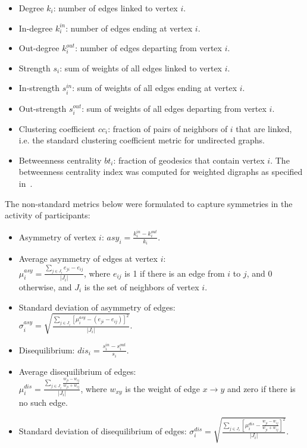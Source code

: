 \documentclass[%
aip,
jmp,%
amsmath,amssymb,
reprint,%
]{revtex4-1}
\begin{document}
\begin{itemize}
\item Degree     $k_i$: number of edges linked to vertex $i$.
\item In-degree  $k_i^{in}$: number of edges ending at vertex $i$.
\item Out-degree $k_i^{out}$: number of edges departing from vertex $i$.
\item Strength $s_i$: sum of weights of all edges linked to vertex $i$.
\item In-strength $s_i^{in}$: sum of weights of all edges ending at vertex $i$.
\item Out-strength $s_i^{out}$: sum of weights of all edges departing from vertex $i$.
\item Clustering coefficient $cc_i$: fraction of pairs of neighbors of $i$ that are linked, i.e. the standard clustering coefficient metric for undirected graphs.
\item Betweenness centrality $bt_i$: fraction of geodesics that contain vertex $i$. The betweenness centrality index was computed for weighted digraphs as specified in~\cite{faster}.
\end{itemize}

The non-standard metrics below were formulated to capture symmetries in the activity of participants:

\begin{itemize}
\item Asymmetry of vertex $i$: $asy_i=\frac{k_i^{in}-k_i^{out}}{k_i}$.
\item Average asymmetry of edges at vertex $i$:\\ $\mu_i^{asy}=\frac{\sum_{j\in J_i} e_{ji}-e_{ij}}{|J_i|}$, where $e_{ij}$ is 1 if there is an edge from $i$ to $j$, and $0$ otherwise, and $J_i$ is the set of neighbors of vertex $i$.
\item Standard deviation of asymmetry of edges:\\ $\sigma_i^{asy}=\sqrt{\frac{\sum_{j\in J_i}[\mu^{asy}_i -(e_{ji}-e_{ij}) ]^2  }{|J_i|}  }$.
\item Disequilibrium: $dis_i=\frac{s_i^{in}-s_i^{out}}{s_i}$.
\item Average disequilibrium of edges:\\ $\mu_i^{dis}=\frac{\sum_{j \in J_i}\frac{w_{ji}-w_{ij}}{w_{ji}+w_{ij}}}{|J_i|}$, where $w_{xy}$ is the weight of edge $x\rightarrow y$ and zero if there is no such edge.
\item Standard deviation of disequilibrium of edges: $\sigma_i^{dis}=\sqrt{\frac{\sum_{j\in J_i}\left[\mu^{dis}_i-\frac{w_{ji}-w_{ij}}{w_{ji}+w_{ij}}\right]^2}{|J_i|}}$.
\end{itemize}
\end{document}
